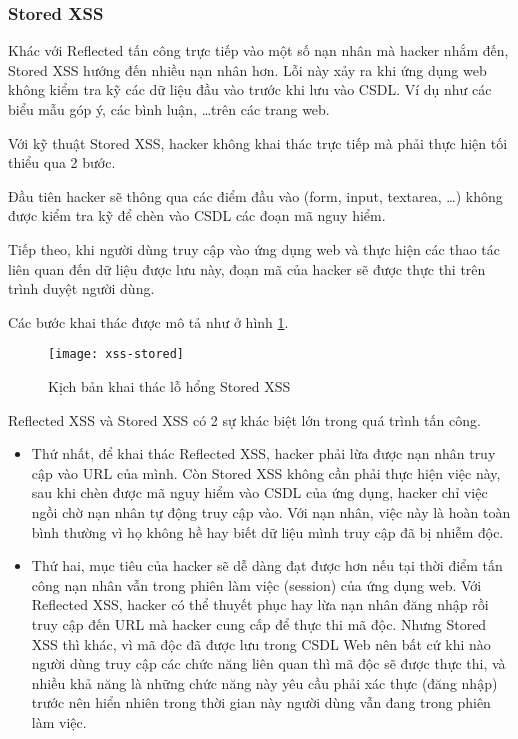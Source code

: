 \documentclass[../main-report.tex]{subfiles}
\begin{document}
\subsubsection*{Stored XSS}
Khác với Reflected tấn công trực tiếp vào một số nạn nhân mà hacker nhắm đến, Stored XSS hướng đến nhiều nạn nhân hơn. Lỗi này xảy ra khi ứng dụng web không kiểm tra kỹ các dữ liệu đầu vào trước khi lưu vào CSDL. Ví dụ như các biểu mẫu góp ý, các bình luận, \ldots trên các trang web.

Với kỹ thuật Stored XSS, hacker không khai thác trực tiếp mà phải thực hiện tối thiểu qua 2 bước.

Đầu tiên hacker sẽ thông qua các điểm đầu vào (form, input, textarea, \ldots) không được kiểm tra kỹ để chèn vào CSDL các đoạn mã nguy hiểm.

Tiếp theo, khi người dùng truy cập vào ứng dụng web và thực hiện các thao tác liên quan đến dữ liệu được lưu này, đoạn mã của hacker sẽ được thực thi trên trình duyệt người dùng.

Các bước khai thác được mô tả như ở hình \ref{fig:xss_stored}.

\begin{figure}[ht!]
\centering\texttt{[image: xss-stored]}
\caption{Kịch bản khai thác lỗ hổng Stored XSS}
\label{fig:xss_stored}
\end{figure}

Reflected XSS và Stored XSS có 2 sự khác biệt lớn trong quá trình tấn công.

\begin{itemize}
\item Thứ nhất, để khai thác Reflected XSS, hacker phải lừa được nạn nhân truy cập vào URL của mình. Còn Stored XSS không cần phải thực hiện việc này, sau khi chèn được mã nguy hiểm vào CSDL của ứng dụng, hacker chỉ việc ngồi chờ nạn nhân tự động truy cập vào. Với nạn nhân, việc này là hoàn toàn bình thường vì họ không hề hay biết dữ liệu mình truy cập đã bị nhiễm độc.
\item Thứ hai, mục tiêu của hacker sẽ dễ dàng đạt được hơn nếu tại thời điểm tấn công nạn nhân vẫn trong phiên làm việc (session) của ứng dụng web. Với Reflected XSS, hacker có thể thuyết phục hay lừa nạn nhân đăng nhập rồi truy cập đến URL mà hacker cung cấp để thực thi mã độc. Nhưng Stored XSS thì khác, vì mã độc đã được lưu trong CSDL Web nên bất cứ khi nào người dùng truy cập các chức năng liên quan thì mã độc sẽ được thực thi, và nhiều khả năng là những chức năng này yêu cầu phải xác thực (đăng nhập) trước nên hiển nhiên trong thời gian này người dùng vẫn đang trong phiên làm việc.
\end{itemize}
\end{document}
